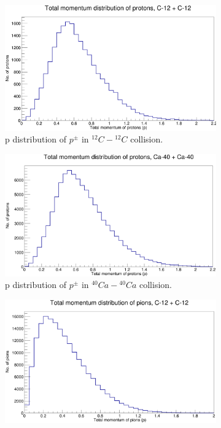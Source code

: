 \documentclass[12pt, twocolumn]{article}
\begin{document}
\begin{figure}[h]
\centering
\begin{subfigure}[h]{0.49\textwidth}
\centering
\includegraphics[scale=0.14]{pToT_protons_C12.png}
\caption{p distribution of $p^{\pm}$ in $^{12}C-{^{12}C}$ collision.}
\label{Generator - Total momentum distribution of protons C12.}
\end{subfigure}
\hfill
\vspace*{1cm}
\begin{subfigure}[h]{0.49\textwidth}
\centering
\includegraphics[scale=0.14]{pToT_protons_Ca.png}
\caption{p distribution of $p^{\pm}$ in $^{40}Ca-{^{40}Ca}$ collision.}
\label{Generator - Total momentum distribution of protons Ca40.}
\end{subfigure}
\hfill
\begin{subfigure}[h]{0.49\textwidth}
\centering
\includegraphics[scale=0.14]{pToT_Pions_C12.png}

\end{subfigure}
\end{figure}
\end{document}
